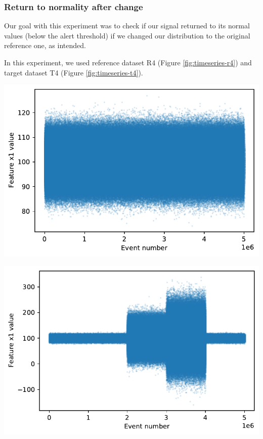 \subsubsection{Return to normality after change}
Our goal with this experiment was to check if our signal returned to its normal values (below the alert threshold) if we changed our distribution to the original reference one, as intended.

In this experiment, we used reference dataset R4 (Figure \ref{fig:timeseries-r4}) and target dataset T4 (Figure \ref{fig:timeseries-t4}). 
\begin{center}
\begin{minipage}{.5\textwidth}
  \centering
  \includegraphics[width=1\linewidth]{figures/timeseries-r4.pdf}
  \label{fig:timeseries-r4}
\end{minipage}%
\begin{minipage}{.5\textwidth}
  \centering
  \includegraphics[width=1\linewidth]{figures/timeseries-t4.pdf}
  \label{fig:timeseries-t4}
\end{minipage}
\end{center}

